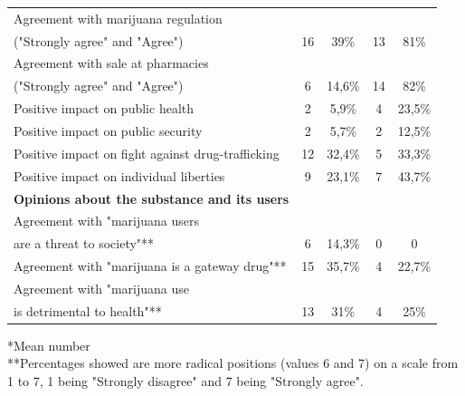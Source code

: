 \documentclass[11pt]{article}
\begin{document}
\begin{samepage}
\begin{table}
\begin{small}
\begin{tabular}{lcccc}
Agreement with marijuana regulation 	&		&		&		&		\\	
("Strongly agree" and "Agree")	&	16	&	39\%	&	13	&	81\% 	\\	
Agreement with sale at pharmacies	&		&		&		&		\\	
 ("Strongly agree" and "Agree")	&	6	&	14,6\%	&	14	&	82\%	\\	
Positive impact on public health 	&	2	&	5,9\%	&	4	&	23,5\%	\\	
Positive impact on public security 	&	2	&	5,7\%	&	2	&	12,5\%	\\	
Positive impact on fight against drug-trafficking	&	12	&	32,4\%	&	5	&	33,3\%	\\	
Positive impact on individual liberties	&	9	&	23,1\%	&	7	&	43,7\%	\\	\hline
\textbf{Opinions about the substance and its users}	&		&		&		&		\\	\hline
Agreement with "marijuana users	&		&		&		&		\\	
are a threat to society"**	&	6	&	14,3\%	&	0	&	0	\\	
Agreement with "marijuana is a gateway drug"**	&	15	&	35,7\%	&	4	&	22,7\%	\\	
Agreement with "marijuana use 	&		&		&		&		\\	
is detrimental to health"**	&	13	&	31\%	&	4	&	25\%	\\	\hline
\end{tabular}
\end{small}
\newline
\tiny{*Mean number \\
**Percentages showed are more radical positions (values 6 and 7) on a scale from 1 to 7, 1 being "Strongly disagree" and 7 being "Strongly agree".}
\end{table}
\end{samepage}
\end{document}
